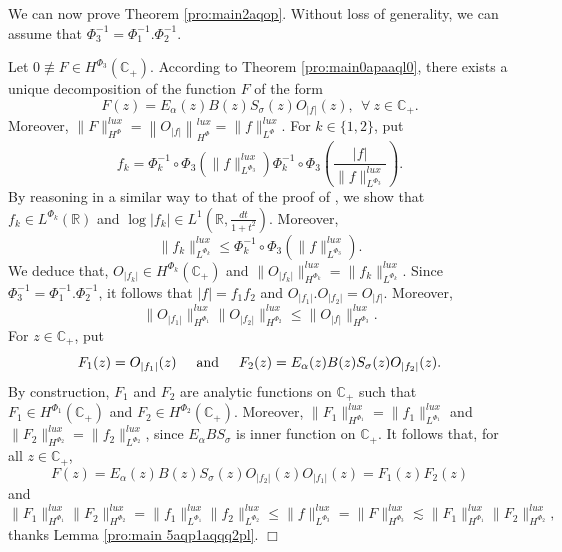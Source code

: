 \documentclass[a4paper,12pt,intlimits,oneside]{amsart}
\theoremstyle{definition}
\numberwithin{equation}{section}
\newcommand{\epf}{ $\Box$\medskip}
\theoremstyle{definition}
\begin{document}
We can now prove Theorem \ref{pro:main2aqop}.
Without loss of generality, we can assume that  $\Phi_{3}^{-1}= \Phi_{1}^{-1}.\Phi_{2}^{-1}$. 

\medskip

Let  $0\not\equiv F\in H^{\Phi_{3}}(\mathbb{C}_{+})$.  According to Theorem \ref{pro:main0apaaql0}, there exists a unique decomposition of the function $F$ of the form
$$  F(z) = E_{\alpha}(z)B(z)S_{\sigma}(z)O_{|f|}(z), ~~\forall~z\in \mathbb{C}_{+}.   $$
Moreover, 
  $ \|F\|_{H^{\Phi}}^{lux}= \left\|O_{|f|}\right\|_{H^{\Phi}}^{lux}=\|f\|_{L^{\Phi}}^{lux}.$ For $k \in \{1,2\}$, put   $$ f_{k}= \Phi_{k}^{-1}\circ\Phi_{3}\left(\|f\|_{L^{\Phi_{3}}}^{lux}\right)  \Phi_{k}^{-1}\circ\Phi_{3}\left(\frac{|f|}{\|f\|_{L^{\Phi_{3}}}^{lux}}\right).        $$
By reasoning in a similar way to that of the proof of \cite[Theorem 3]{djefeuto1}, we show that  $f_{k}\in  L^{\Phi_{k}}\left(\mathbb{R}\right)$ and $\log|f_{k}| \in  L^{1}\left(\mathbb{R},\frac{dt}{1+t^{2}}\right)$. Moreover,    
$$ \|f_{k}\|_{L^{\Phi_{k}}}^{lux} \leq \Phi_{k}^{-1}\circ\Phi_{3}\left(\|f\|_{L^{\Phi_{3}}}^{lux}\right).  $$
We deduce that, $O_{|f_{k}|} \in H^{\Phi_{k}}(\mathbb{C}_{+})$ and 
$\|O_{|f_{k}|}\|_{H^{\Phi_{k}}}^{lux}=\|f_{k}\|_{L^{\Phi_{k}}}^{lux}$. Since  $\Phi_{3}^{-1}= \Phi_{1}^{-1}.\Phi_{2}^{-1}$, it follows that $|f| = f_{1}f_{2}$ and $O_{|f_{1}|}.O_{|f_{2}|}=O_{|f|}$. Moreover, 
\begin{equation}\label{eq:inegaaqlitedehay}
\|O_{|f_{1}|}\|_{H^{\Phi_{1}}}^{lux}\|O_{|f_{2}|}\|_{H^{\Phi_{2}}}^{lux}  \leq \|O_{|f|}\|_{H^{\Phi_{3}}}^{lux}.
\end{equation}
For $z \in \mathbb{C}_{+}$, put  
$$  F_{1}(z) =O_{|f_{1}|}(z)   \hspace*{0.5cm}\textrm{and} \hspace*{0.5cm} F_{2}(z) =E_{\alpha}(z)B(z)S_{\sigma}(z)O_{|f_{2}|}(z).  $$
By construction, $F_{1}$ and $F_{2}$ are analytic functions on $\mathbb{C}_{+}$ such that  $F_{1} \in H^{\Phi_{1}}(\mathbb{C}_{+})$ and $F_{2} \in H^{\Phi_{2}}(\mathbb{C}_{+})$. Moreover, $\|F_{1}\|_{H^{\Phi_{1}}}^{lux}=\|f_{1}\|_{L^{\Phi_{1}}}^{lux}$ and $\|F_{2}\|_{H^{\Phi_{2}}}^{lux}=\|f_{2}\|_{L^{\Phi_{2}}}^{lux}$, since  $E_{\alpha}B S_{\sigma}$  is inner function on $\mathbb{C}_{+}$. It follows that, for all $z\in \mathbb{C}_{+}$, 
$$ F(z) =E_{\alpha}(z)B(z)S_{\sigma}(z)O_{|f_{2}|}(z)O_{|f_{1}|}(z)=   F_{1}(z) F_{2}(z)$$ 
and
$$  \|F_{1}\|_{H^{\Phi_{1}}}^{lux}\|F_{2}\|_{H^{\Phi_{2}}}^{lux}=\|f_{1}\|_{L^{\Phi_{1}}}^{lux}\|f_{2}\|_{L^{\Phi_{2}}}^{lux} \leq \|f\|_{L^{\Phi_{3}}}^{lux} = \|F\|_{H^{\Phi_{3}}}^{lux} \lesssim \|F_{1}\|_{H^{\Phi_{1}}}^{lux}\|F_{2}\|_{H^{\Phi_{2}}}^{lux},
  $$
thanks Lemma \ref{pro:main 5aqp1aqqq2pl}.
\epf
\end{document}
